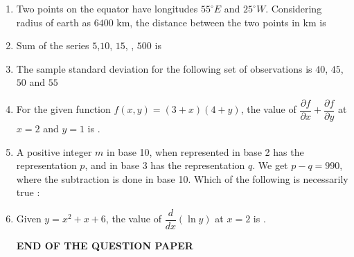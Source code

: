 \documentclass[journal,12pt,onecolumn]{IEEEtran}
\theoremstyle{remark}
\begin{document}
\begin{enumerate}
\item Two points on the equator have longitudes $55^\circ E$ and $25^\circ W$. Considering radius of earth as $6400$ km, the distance between the two points in km is

\hfill{}
\item Sum of the series $5$,$10$, $15$,   , $500$ is 

\hfill{}
\item The sample standard deviation for the following set of observations is $40$, $45$, $50$ and $55$

\hfill{}
\item For the given function $f(x,y) = (3+x)(4+y)$, the value of 
$\dfrac{\partial f}{\partial x} + \dfrac{\partial f}{\partial y}$ 
at $x=2$ and $y=1$ is \underline{\hspace{2cm}}.


\hfill{}
\item A positive integer $m$ in base 10, when represented in base 2 has the representation $p$, and in base 3 has the representation $q$. We get $p - q = 990$, where the subtraction is done in base 10. Which of the following is necessarily true $\colon$

\hfill{}
\item Given $y = x^2 + x + 6$, the value of $\dfrac{d}{dx}(\ln y)$ at $x=2$ is \underline{\hspace{2cm}}.
\hfill{}
\begin{center}
\Large\textbf{{END OF THE QUESTION PAPER}}
\end{center}
\end{enumerate}
\end{document}
